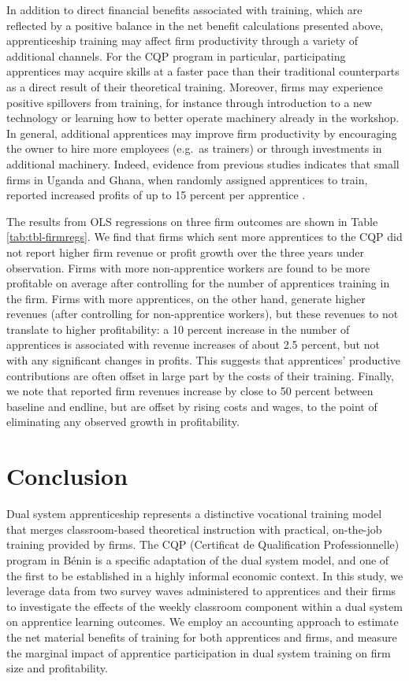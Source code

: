 \documentclass[
  a4paper, twoside, 12pt]{book}
\renewcommand{\hl}[1]{#1}
\begin{document}
In addition to direct financial benefits associated with training, which are reflected by a positive balance in the net benefit calculations presented above, apprenticeship training may affect firm productivity through a variety of additional channels. For the CQP program in particular, participating apprentices may acquire skills at a faster pace than their traditional counterparts as a direct result of their theoretical training. Moreover, firms may experience positive spillovers from training, for instance through introduction to a new technology or learning how to better operate machinery already in the workshop. In general, additional apprentices may improve firm productivity by encouraging the owner to hire more employees (e.g.~as trainers) or through investments in additional machinery. Indeed, evidence from previous studies indicates that small firms in Uganda and Ghana, when randomly assigned apprentices to train, reported increased profits of up to 15 percent per apprentice \autocite{hardy2022,alfonsi2020}.

The results from OLS regressions on three firm outcomes are shown in Table \ref{tab:tbl-firmregs}. We find that firms which sent more apprentices to the CQP did not report higher firm revenue or profit growth over the three years under observation. Firms with more non-apprentice workers are found to be more profitable on average after controlling for the number of apprentices training in the firm. Firms with more apprentices, on the other hand, generate higher revenues (after controlling for non-apprentice workers), but these revenues to not translate to higher profitability: a 10 percent increase in the number of apprentices is associated with revenue increases of about 2.5 percent, but not with any significant changes in profits. This suggests that apprentices' productive contributions are often offset in large part by the costs of their training. Finally, we note that reported firm revenues increase by close to 50 percent between baseline and endline, but are offset by rising costs and wages, to the point of eliminating any observed growth in profitability.

\hypertarget{cqp-conclusion}{%
\section{Conclusion}\label{cqp-conclusion}}

\hl{Dual system apprenticeship represents a distinctive vocational training model that merges classroom-based theoretical instruction with practical, on-the-job training provided by firms. The CQP (Certificat de Qualification Professionnelle) program in Bénin is a specific adaptation of the dual system model, and one of the first to be established in a highly informal economic context. In this study, we leverage data from two survey waves administered to apprentices and their firms to investigate the effects of the weekly classroom component within a dual system on apprentice learning outcomes. We employ an accounting approach to estimate the net material benefits of training for both apprentices and firms, and measure the marginal impact of apprentice participation in dual system training on firm size and profitability.}
\end{document}
